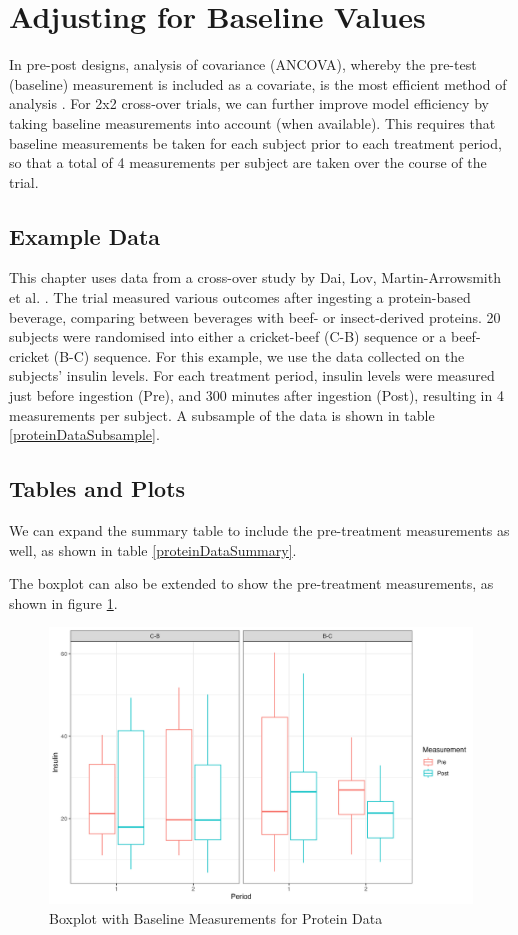 \documentclass[12pt, TexShade, letterpaper]{report}
\begin{document}
\section{Adjusting for Baseline Values}
In pre-post designs, analysis of covariance (ANCOVA), whereby the pre-test (baseline) measurement is included as a covariate, is the most efficient method of analysis \cite{wan2021statistical}. For 2x2 cross-over trials, we can further improve model efficiency by taking baseline measurements into account (when available). This requires that baseline measurements be taken for each subject prior to each treatment period, so that a total of 4 measurements per subject are taken over the course of the trial.

\subsection{Example Data}
This chapter uses data from a cross-over study by Dai, Lov, Martin-Arrowsmith et al. \cite{dai2022insect}. The trial measured various outcomes after ingesting a protein-based beverage, comparing between beverages with beef- or insect-derived proteins. 20 subjects were randomised into either a cricket-beef (C-B) sequence or a beef-cricket (B-C) sequence. For this example, we use the data collected on the subjects' insulin levels. For each treatment period, insulin levels were measured just before ingestion (Pre), and 300 minutes after ingestion (Post), resulting in 4 measurements per subject. A subsample of the data is shown in table \ref{proteinDataSubsample}.



\subsection{Tables and Plots}
We can expand the summary table to include the pre-treatment measurements as well, as shown in table \ref{proteinDataSummary}.



The boxplot can also be extended to show the pre-treatment measurements, as shown in figure \ref{fig:proteinBoxplot}.

\begin{figure}
    \centering
    \includegraphics[width=0.85\linewidth]{report/figures/ch3/proteinBoxplot.png}
    \caption{Boxplot with Baseline Measurements for Protein Data}
    \label{fig:proteinBoxplot}
\end{figure}
\end{document}
